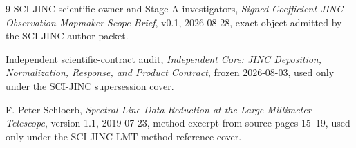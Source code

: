\documentclass[11pt]{article}
\begin{document}







\clearpage
\begin{thebibliography}{9}
SCI-JINC scientific owner and Stage A investigators,
\emph{Signed-Coefficient JINC Observation Mapmaker Scope Brief}, v0.1,
2026-08-28, exact object admitted by the SCI-JINC author packet.

Independent scientific-contract audit,
\emph{Independent Core: JINC Deposition, Normalization, Response, and Product
Contract}, frozen 2026-08-03, used only under the SCI-JINC supersession cover.

F. Peter Schloerb,
\emph{Spectral Line Data Reduction at the Large Millimeter Telescope},
version 1.1, 2019-07-23, method excerpt from source pages 15--19, used only
under the SCI-JINC LMT method reference cover.
\end{thebibliography}
\end{document}
